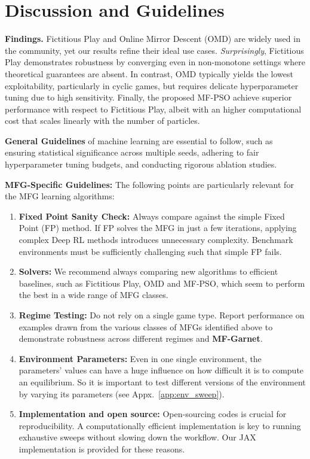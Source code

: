 \documentclass[10pt,twocolumn,letterpaper]{article}
\theoremstyle{definition}
\theoremstyle{remark}
\begin{document}
\section{Discussion and Guidelines}

\noindent\textbf{Findings.} Fictitious Play and Online Mirror Descent (OMD) are widely used in the community, yet our results refine their ideal use cases. \textit{Surprisingly}, Fictitious Play demonstrates robustness by converging even in non-monotone settings where theoretical guarantees are absent. In contrast, OMD typically yields the lowest exploitability, particularly in cyclic games, but requires delicate hyperparameter tuning due to high sensitivity. Finally, the proposed MF-PSO achieve superior performance with respect to Fictitious Play, albeit with an higher computational cost that scales linearly with the number of particles. %

\noindent\textbf{General Guidelines} of machine learning are essential to follow, such as ensuring statistical significance across multiple seeds, adhering to fair hyperparameter tuning budgets, and conducting rigorous ablation studies.

\noindent\textbf{MFG-Specific Guidelines:} The following points are particularly relevant for the MFG learning algorithms:
\begin{enumerate}
    \item \textbf{Fixed Point Sanity Check:} Always compare against the simple Fixed Point (FP) method. If FP solves the MFG in just a few iterations, applying complex Deep RL methods introduces unnecessary complexity. Benchmark environments must be sufficiently challenging such that simple FP fails.
    \item \textbf{Solvers:} We recommend always comparing new algorithms to efficient baselines, such as Fictitious Play, OMD and MF-PSO, which seem to perform the best in a wide range of MFG classes.
    \item \textbf{Regime Testing:} Do not rely on a single game type. Report performance on examples drawn from the various classes of MFGs identified above to demonstrate robustness across different regimes and \textbf{MF-Garnet}.
    \item \textbf{Environment Parameters:} Even in one single environment, the parameters' values can have a huge influence on how difficult it is to compute an equilibrium. So it is important to test different versions of the environment by varying its parameters (see Appx.~\ref{app:env_sweep}). 
    \item \textbf{Implementation and open source:} Open-sourcing codes is crucial for reproducibility. A computationally efficient implementation is key to running exhaustive sweeps without slowing down the workflow. Our JAX implementation is provided for these reasons. 
\end{enumerate}
\end{document}
